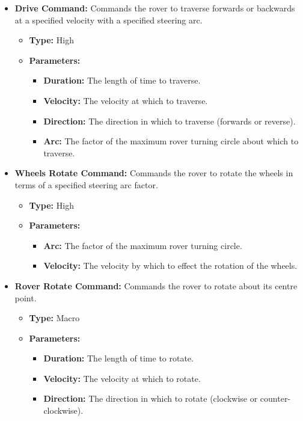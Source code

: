 \begin{itemize}
          \item \textbf{Drive Command:} Commands the rover to traverse forwards or backwards at a specified velocity with a specified steering arc.
          \begin{itemize}
            \item \textbf{Type:} High
            \item \textbf{Parameters:}
            \begin{itemize}
              \item \textbf{Duration:} The length of time to traverse.
              \item \textbf{Velocity:} The velocity at which to traverse.
              \item \textbf{Direction:} The direction in which to traverse (forwards or reverse).
              \item \textbf{Arc:} The factor of the maximum rover turning circle about which to traverse.
            \end{itemize}
          \end{itemize}
          
          \item \textbf{Wheels Rotate Command:} Commands the rover to rotate the wheels in terms of a specified steering arc factor.
          \begin{itemize}
            \item \textbf{Type:} High
            \item \textbf{Parameters:}
            \begin{itemize}
              \item \textbf{Arc:} The factor of the maximum rover turning circle.
              \item \textbf{Velocity:} The velocity by which to effect the rotation of the wheels.
            \end{itemize}
          \end{itemize}
          
          \item \textbf{Rover Rotate Command:} Commands the rover to rotate about its centre point.
          \begin{itemize}
            \item \textbf{Type:} Macro
            \item \textbf{Parameters:}
            \begin{itemize}
              \item \textbf{Duration:} The length of time to rotate.
              \item \textbf{Velocity:} The velocity at which to rotate.
              \item \textbf{Direction:} The direction in which to rotate (clockwise or counter-clockwise).
            \end{itemize}
          \end{itemize}
          

\end{itemize}
